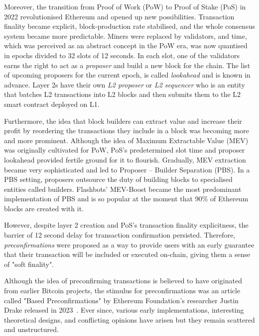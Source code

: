 \documentclass[conference]{IEEEtran}
\theoremstyle{boldstyle}
\begin{document}
Moreover, the transition from Proof of Work (PoW) to Proof of Stake (PoS) in 2022 revolutionised Ethereum and opened up new possibilities. Transaction finality became explicit, block-production rate stabilised, and the whole consensus system became more predictable. Miners were replaced by validators, and time, which was perceived as an abstract concept in the PoW era, was now quantised in epochs divided to 32 slots of 12 seconds. In each slot, one of the validators earns the right to act as a \textit{proposer} and build a new block for the chain. The list of upcoming proposers for the current epoch, is called \textit{lookahead} and is known in advance. Layer 2s have their own \textit{L2 proposer} or \textit{L2 sequencer} who is an entity that batches L2 transactions into L2 blocks and then submits them to the L2 smart contract deployed on L1\cite{W:AnatomyofaSlot:Thetumultuous12secondsduringEthereumslots}.

Furthermore, the idea that block builders can extract value and increase their profit by reordering the transactions they include in a block was becoming more and more prominent. Although the idea of Maximum Extractable Value (MEV) was originally cultivated for PoW, PoS's predetermined slot time and proposer lookahead provided fertile ground for it to flourish. Gradually, MEV extraction became very sophisticated and led to Proposer -- Builder Separation (PBS). In a PBS setting, proposers outsource the duty of building blocks to specialised entities called builders. Flashbots' MEV-Boost became the most predominant implementation of PBS and is so popular at the moment that 90\% of Ethereum blocks are created with it.

However, despite layer 2 creation and PoS's transaction finality explicitness, the barrier of 12 second delay for transaction confirmation persisted. Therefore, \textit{preconfirmations} were proposed as a way to provide users with an early guarantee that their transaction will be included or executed on-chain, giving them a sense of "soft finality".

Although the idea of preconfirming transactions is believed to have originated from earlier Bitcoin projects, the stimulus for preconfirmations was an article called "Based Preconfirmations" by Ethereum Foundation's researcher Justin Drake released in 2023~\cite{W:Basedpreconfirmations}. Ever since, various early implementations, interesting theoretical designs, and conflicting opinions have arisen but they remain scattered and unstructured. 
\end{document}
